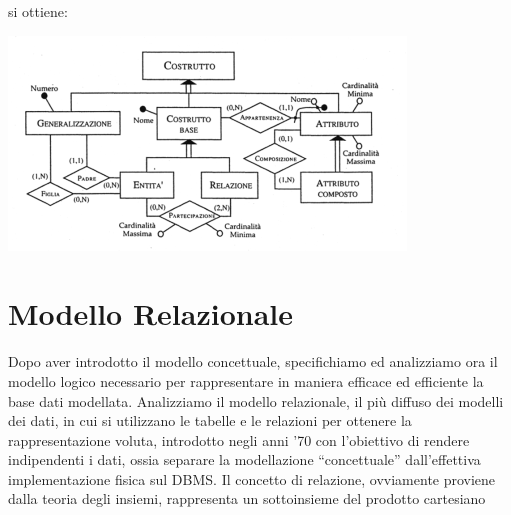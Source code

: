 \documentclass[a4paper,12pt, oneside]{book}
\begin{document}
si ottiene:
\begin{center}
\includegraphics[scale=0.8]{img/vin3.png}
\end{center}
\newpage
\chapter{Modello Relazionale}
Dopo aver introdotto il modello concettuale, specifichiamo ed analizziamo ora il modello logico necessario per 
rappresentare in maniera efficace ed efficiente la base dati modellata.\newline
Analizziamo il modello relazionale, il più diffuso dei modelli dei dati, in cui si utilizzano le tabelle e le relazioni
per ottenere la rappresentazione voluta, introdotto negli anni '70 con l'obiettivo di rendere indipendenti i dati,
ossia separare la modellazione ``concettuale'' dall'effettiva implementazione fisica sul DBMS.
Il concetto di relazione, ovviamente proviene dalla teoria degli insiemi, rappresenta un sottoinsieme del prodotto cartesiano
\end{document}
